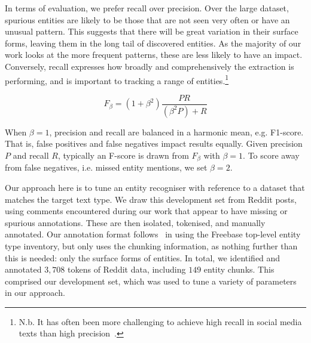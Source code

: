 \documentclass[review]{elsarticle}
\begin{document}
In terms of evaluation, we prefer recall over precision.
Over the large dataset, spurious entities are likely to be those that are not seen very often or have an unusual pattern.
This suggests that there will be great variation in their surface forms, leaving them in the long tail of discovered entities.
As the majority of our work looks at the more frequent patterns, these are less likely to have an impact.
Conversely, recall expresses how broadly and comprehensively the extraction is performing, and is important to tracking a range of entities.\footnote{N.b. It has often been more challenging to achieve high recall in social media texts than high precision~\cite{ritter2011named,derczynski2015analysis}.}

\begin{equation}
F_\beta = (1+\beta^2)\frac{PR}{(\beta^2 P) + R} 
\end{equation}


When $\beta=1$, precision and recall are balanced in a harmonic mean, e.g. F1-score.
That is, false positives and false negatives impact results equally.
Given precision $P$ and recall $R$, typically an F-score is drawn from $F_\beta$ with $\beta=1$.
To score away from false negatives, i.e. missed entity mentions, we set $\beta=2$.

Our approach here is to tune an entity recogniser with reference to a dataset that matches the target text type.
We draw this development set from Reddit posts, using comments encountered during our work that appear to have missing or spurious annotations.
These are then isolated, tokenised, and manually annotated.
Our annotation format follows~\cite{ritter2011named} in using the Freebase top-level entity type inventory, but only uses the chunking information, as nothing further than this is needed: only the surface forms of entities.
In total, we identified and annotated $3,708$ tokens of Reddit data, including $149$ entity chunks.
This comprised our development set, which was used to tune a variety of parameters in our approach.
\end{document}
